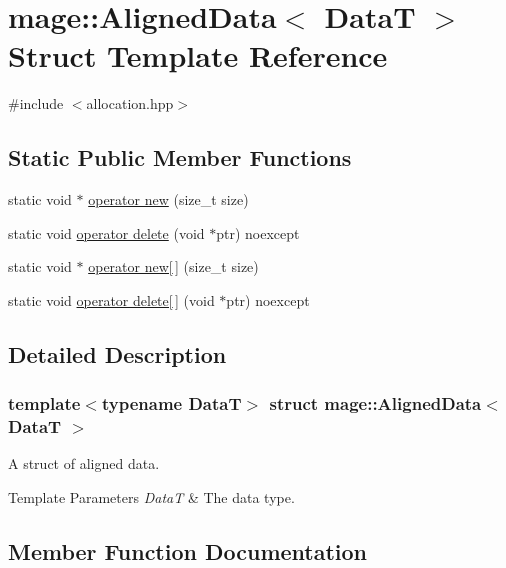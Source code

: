 \hypertarget{structmage_1_1_aligned_data}{}\section{mage\+:\+:Aligned\+Data$<$ DataT $>$ Struct Template Reference}
\label{structmage_1_1_aligned_data}


{\ttfamily \#include $<$allocation.\+hpp$>$}

\subsection*{Static Public Member Functions}
\begin{DoxyCompactItemize}
\item 
static void $\ast$ \hyperlink{structmage_1_1_aligned_data_a0ddb884f1857519ceaf10d8980ff896b}{operator new} (size\+\_\+t size)
\item 
static void \hyperlink{structmage_1_1_aligned_data_a3e0b0d36f1a0a9ec78c1611103436ffc}{operator delete} (void $\ast$ptr) noexcept
\item 
static void $\ast$ \hyperlink{structmage_1_1_aligned_data_a139865ffc435aebff7703d68d8111f24}{operator new\mbox{[}$\,$\mbox{]}} (size\+\_\+t size)
\item 
static void \hyperlink{structmage_1_1_aligned_data_a257c2d30f4764caf48647e1f759d28b4}{operator delete\mbox{[}$\,$\mbox{]}} (void $\ast$ptr) noexcept
\end{DoxyCompactItemize}


\subsection{Detailed Description}
\subsubsection*{template$<$typename DataT$>$\newline
struct mage\+::\+Aligned\+Data$<$ Data\+T $>$}

A struct of aligned data.


\begin{DoxyTemplParams}{Template Parameters}
{\em DataT} & The data type. \\
\hline
\end{DoxyTemplParams}


\subsection{Member Function Documentation}
\hypertarget{structmage_1_1_aligned_data_a3e0b0d36f1a0a9ec78c1611103436ffc}{}\label{structmage_1_1_aligned_data_a3e0b0d36f1a0a9ec78c1611103436ffc} 
